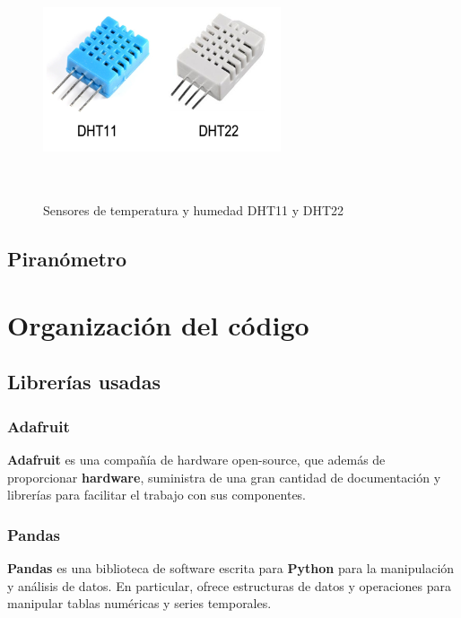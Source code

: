  \begin{figure}[htb]
	
	\begin{center}
		\includegraphics[width=7cm,height=7cm]{figures/sensorTemperaturaHumedad.png}
		\caption{Sensores de temperatura y humedad DHT11 y DHT22}
	\end{center}
	
	\label{sensor}
\end{figure} 

\subsection{Piranómetro}

\section{Organización del código}
\label{makereference4.3} 
	\subsection{Librerías usadas}
		\subsubsection{Adafruit}
		\textbf{Adafruit} es una compañía de hardware open-source, que además de proporcionar \textbf{hardware}, suministra de una gran cantidad de documentación y librerías para facilitar el trabajo con sus componentes.
		
		\subsubsection{Pandas}
		\textbf{Pandas} es una biblioteca de software escrita para \textbf{Python} para la manipulación y análisis de datos. En particular, ofrece estructuras de datos y operaciones para manipular tablas numéricas y series temporales.
		
